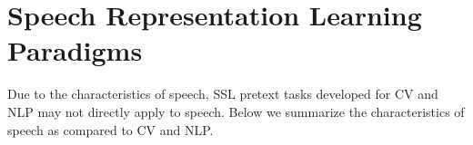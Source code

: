 
\section{Speech Representation Learning Paradigms} \label{sec:approach}
Due to the characteristics of speech, SSL pretext tasks developed for CV
and NLP may not directly apply to speech.
Below we summarize the characteristics of speech as compared to CV and NLP.
